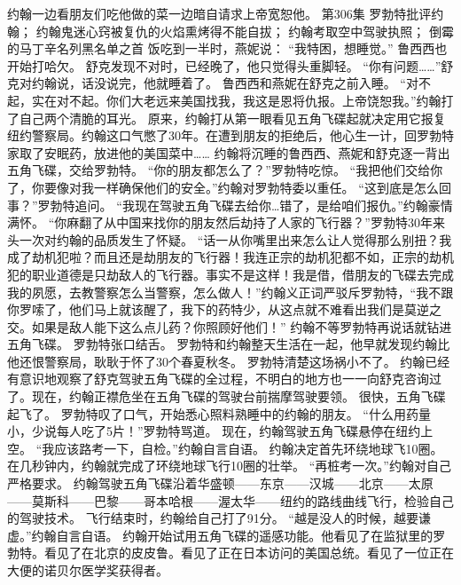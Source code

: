 \documentclass[a4paper,12pt,UTF8,twoside]{ctexbook}
\begin{document}
        约翰一边看朋友们吃他做的菜一边暗自请求上帝宽恕他。          第306集  
        罗勃特批评约翰；  
        约翰鬼迷心窍被复仇的火焰熏烤得不能自拔；  
        约翰考取空中驾驶执照；  
        倒霉的马丁辛名列黑名单之首    
        饭吃到一半时，燕妮说：  
        “我特困，想睡觉。”  
        鲁西西也开始打哈欠。  
        舒克发现不对时，已经晚了，他只觉得头重脚轻。  
        “你有问题……”舒克对约翰说，话没说完，他就睡着了。  
        鲁西西和燕妮在舒克之前入睡。  
        “对不起，实在对不起。你们大老远来美国找我，我这是恩将仇报。上帝饶恕我。”约翰打了自己两个清脆的耳光。  
        原来，约翰打从第一眼看见五角飞碟起就决定用它报复纽约警察局。约翰这口气憋了30年。在遭到朋友的拒绝后，他心生一计，回罗勃特家取了安眠药，放进他的美国菜中……  
        约翰将沉睡的鲁西西、燕妮和舒克逐一背出五角飞碟，交给罗勃特。  
        “你的朋友都怎么了？”罗勃特吃惊。  
        “我把他们交给你了，你要像对我一样确保他们的安全。”约翰对罗勃特委以重任。  
        “这到底是怎么回事？”罗勃特追问。  
        “我现在驾驶五角飞碟去给你…错了，是给咱们报仇。”约翰豪情满怀。  
        “你麻翻了从中国来找你的朋友然后劫持了人家的飞行器？”罗勃特30年来头一次对约翰的品质发生了怀疑。  
        “话一从你嘴里出来怎么让人觉得那么别扭？我成了劫机犯啦？而且还是劫朋友的飞行器！我连正宗的劫机犯都不如，正宗的劫机犯的职业道德是只劫敌人的飞行器。事实不是这样！我是借，借朋友的飞碟去完成我的夙愿，去教警察怎么当警察，怎么做人！”约翰义正词严驳斥罗勃特，“我不跟你罗嗦了，他们马上就该醒了，我下的药特少，从这点就不难看出我们是莫逆之交。如果是敌人能下这么点儿药？你照顾好他们！”  
        约翰不等罗勃特再说话就钻进五角飞碟。  
        罗勃特张口结舌。  
        罗勃特和约翰整天生活在一起，他早就发现约翰比他还恨警察局，耿耿于怀了30个春夏秋冬。  
        罗勃特清楚这场祸小不了。  
        约翰已经有意识地观察了舒克驾驶五角飞碟的全过程，不明白的地方也一一向舒克咨询过了。现在，约翰正襟危坐在五角飞碟的驾驶台前揣摩驾驶要领。  
        很快，五角飞碟起飞了。  
        罗勃特叹了口气，开始悉心照料熟睡中的约翰的朋友。  
        “什么用药量小，少说每人吃了5片！”罗勃特骂道。  
        现在，约翰驾驶五角飞碟悬停在纽约上空。  
        “我应该路考一下，自检。”约翰自言自语。  
        约翰决定首先环绕地球飞10圈。  
        在几秒钟内，约翰就完成了环绕地球飞行10圈的壮举。  
        “再桩考一次。”约翰对自己严格要求。  
        约翰驾驶五角飞碟沿着华盛顿——东京——汉城——北京——太原——莫斯科——巴黎——哥本哈根——渥太华——纽约的路线曲线飞行，检验自己的驾驶技术。  
        飞行结束时，约翰给自己打了91分。  
        “越是没人的时候，越要谦虚。”约翰自言自语。  
        约翰开始试用五角飞碟的遥感功能。他看见了在监狱里的罗勃特。看见了在北京的皮皮鲁。看见了正在日本访问的美国总统。看见了一位正在大便的诺贝尔医学奖获得者。  
\end{document}
